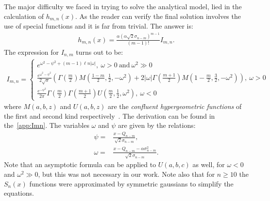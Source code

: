 \documentclass[preprint,12pt]{elsarticle}
\begin{document}
The major difficulty we faced in trying to solve the analytical model, lied in the calculation of $h_{m,n}(x)$. 
As the reader can verify the final solution involves the use of special functions and it is far from trivial. 
The answer is:
\begin{align}
h_{m,n}(x) =  \frac{\alpha (\alpha\sqrt{2} \sigma_{n-m})^{m-1}}{(m-1)!}  I_{m,n}.
\end{align}  
The expression for $I_{n,m}$ turns out to be:
\begin{align}
I_{m,n} = 
\begin{cases}
  e^{\omega^2 - \psi^2 + (m-1) \ell n |\omega|}, \ \omega>0 \ \text{and} \  \omega^2 \gg 0\\
\frac{ e^{\omega^2 -\psi^2 } }{ 2\sqrt{\pi} }\left( \Gamma\left( \frac{m}{2} \right) M\left(\frac{1-m}{2}, \frac{1}{2}, -\omega^2 \right)  
+ 2|\omega| \Gamma\left( \frac{m+1}{2} \right) M\left(1-\frac{m}{2}, \frac{3}{2}, -\omega^2 \right)       \right), \ \omega > 0  \\
\frac{ e^{ -\psi^2 } }{2\pi}   \Gamma\left( \frac{m}{2} \right)   \Gamma\left( \frac{m+1}{2} \right) U\left( \frac{m}{2}, \frac{1}{2}, \omega^2  \right), \ \omega<0
\end{cases}
\nonumber
\end{align} 
where $M(a,b,z)$ and $U(a,b,z)$ are the \emph{confluent hypergeometric functions} of the first and second kind respectively~\cite{error}. 
The derivation can be found in the~\ref{app:Imn}. 
The variables $\omega$ and $\psi$ are given by the relations:
\begin{align}
\psi = & \frac{x-Q_{n-m}}{\sqrt{2}\sigma_{n-m}}, \\
\omega = & \frac{x-Q_{n-m} -\alpha\sigma^2_{n-m}}{\sqrt{2}\sigma_{n-m}}.
\end{align}  
Note that an asymptotic formula can be applied to $U(a,b,c)$ as well, for $\omega < 0$ and $\omega^2 \gg 0$, but this was not necessary in our work. 
Note also that for $n\geq10$ the $S_n(x)$ functions were approximated by symmetric gaussians to simplify the equations. 
\end{document}
